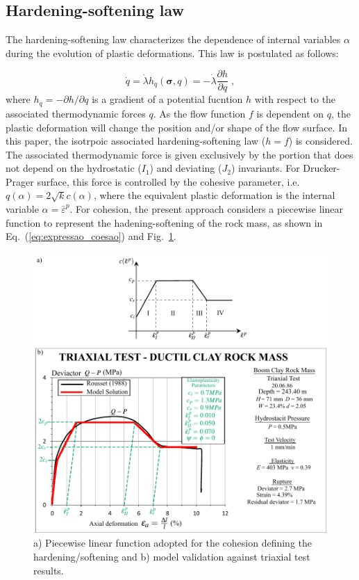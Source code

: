 \documentclass[Journal,letterpaper]{ascelike-new}
\newcommand{\hl}{{h_q}}
\newcommand{\strainpeq}{\bar \varepsilon^p}
\newcommand{\stress}{\boldsymbol{\sigma}}
\begin{document}
\subsection{Hardening-softening law}

The hardening-softening law characterizes the dependence of internal variables $\alpha$ during the evolution of plastic deformations. This law is postulated as follows:

\begin{equation} \label{eq_hardening_law}
	\dot q = \dot \lambda \hl(\stress,q) = - \dot \lambda \dfrac{\partial h}{\partial q}\;,
\end{equation}
where $\hl = -\partial h / \partial q$ is a gradient of a potential fucntion $h$ with respect to the associated thermodynamic forces $q$. As the flow function $f$ is dependent on $q$, the plastic deformation will change the position and/or shape of the flow surface. In this paper, the isotrpoic associated hardening-softening law ($h=f$) is considered. The associated thermodynamic force is given exclusively by the portion that does not depend on the hydrostatic ($I_1$) and deviating ($J_2$) invariants. For Drucker-Prager surface, this force is controlled by the cohesive parameter, i.e. $q(\alpha) =  2\sqrt{k}c(\alpha)$, where the equivalent plastic deformation is the internal variable $\alpha = \strainpeq$. For cohesion, the present approach considers a piecewise linear function to represent the hadening-softening of the rock mass, as shown in Eq.~(\ref{eq:expressao_coesao}) and Fig.~\ref{choesive parameter}.

\begin{figure}
	\centering
	\includegraphics[scale=1]{FIG1.pdf}
	\caption{a) Piecewise linear function adopted for the cohesion defining the hardening/softening and b) model validation against triaxial test results.}
	\label{choesive parameter}
\end{figure}
\end{document}
